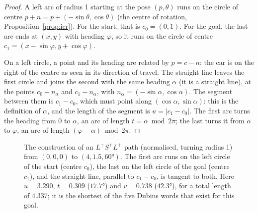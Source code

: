 \begin{proof}
  A left arc of radius 1 starting at the pose $(p, \theta)$ runs on the
  circle of centre $p + n = p + (-\sin\theta, \cos\theta)$ (the centre of
  rotation, Proposition~\ref{prop:icr}). For the start, that is $c_0 = (0,
  1)$. For the goal, the last arc ends at $(x, y)$ with heading $\varphi$, so
  it runs on the circle of centre $c_1 = (x - \sin\varphi, y + \cos\varphi)$.

  On a left circle, a point and its heading are related by $p = c - n$: the
  car is on the right of the centre as seen in its direction of travel. The
  straight line leaves the first circle and joins the second with the same
  heading $\alpha$ (it is a straight line), at the points
  $c_0 - n_\alpha$ and $c_1 - n_\alpha$, with $n_\alpha = (-\sin\alpha,
  \cos\alpha)$. The segment between them is $c_1 - c_0$, which must point
  along $(\cos\alpha, \sin\alpha)$: this is the definition of $\alpha$, and
  the length of the segment is $u = |c_1 - c_0|$. The first arc turns the
  heading from $0$ to $\alpha$, an arc of length $t = \alpha \bmod 2\pi$;
  the last turns it from $\alpha$ to $\varphi$, an arc of length $(\varphi -
  \alpha) \bmod 2\pi$.
\end{proof}

\begin{figure}[ht]
  \centering
  \caption{The construction of an $L^+S^+L^+$ path (normalised, turning
    radius 1) from $(0, 0, 0)$ to $(4, 1.5, 60°)$. The first arc runs on the
    left circle of the start (centre $c_0$), the last on the left circle of
    the goal (centre $c_1$), and the straight line, parallel to $c_1 - c_0$,
    is tangent to both. Here $u = 3.290$, $t = 0.309$ ($17.7°$) and
    $v = 0.738$ ($42.3°$), for a total length of $4.337$; it is the
    shortest of the five Dubins words that exist for this goal.}
  \label{fig:lsl}
\end{figure}

